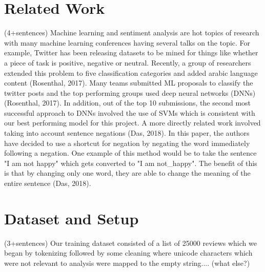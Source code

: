 \documentclass{amsart}
\theoremstyle{definition}
\theoremstyle{remark}
\numberwithin{equation}{section}
\begin{document}
\section{Related Work}(4+sentences)
Machine learning and sentiment analysis are hot topics of research with many machine learning conferences having several talks on the topic.  For example, Twitter has been releasing datasets to be mined for things like whether a piece of task is positive, negative or neutral.  Recently, a group of researchers extended this problem to five classification categories and added arabic language content (Rosenthal, 2017).  Many teams submitted ML proposals to classify the twitter posts and the top performing groups used deep neural networks (DNNs) (Rosenthal, 2017).  In addition, out of the top 10 submissions, the second most successful approach to DNNs involved the use of SVMs which is consistent with our best performing model for this project.  A more directly related work involved taking into account sentence negations (Das, 2018).  In this paper, the authors have decided to use a shortcut for negation by negating the word immediately following a negation.  One example of this method would be to take the sentence "I am not happy" which gets converted to "I am not\_happy".  The benefit of this is that by changing only one word, they are able to change the meaning of the entire sentence (Das, 2018).
\section{Dataset and Setup}(3+sentences)
Our training dataset consisted of a list of 25000 reviews which we began by tokenizing followed by some cleaning where unicode characters which were not relevant to analysis were mapped to the empty string.... (what else?)
\end{document}
